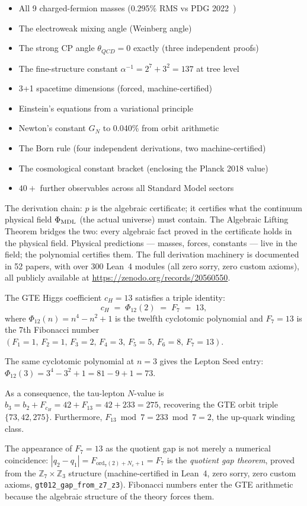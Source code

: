 \documentclass[11pt,a4paper]{article}
\begin{document}
\begin{itemize}
  \item All 9 charged-fermion masses (0.295\% RMS vs PDG 2022~\cite{SpivackSM})
  \item The electroweak mixing angle (Weinberg angle)
  \item The strong CP angle $\theta_{QCD} = 0$ exactly (three independent proofs)
  \item The fine-structure constant $\alpha^{-1} = 2^7 + 3^2 = 137$ at tree level
  \item 3+1 spacetime dimensions (forced, machine-certified)
  \item Einstein's equations from a variational principle
  \item Newton's constant $G_N$ to 0.040\% from orbit arithmetic
  \item The Born rule (four independent derivations, two machine-certified)
  \item The cosmological constant bracket (enclosing the Planck 2018 value)
  \item $40+$ further observables across all Standard Model sectors
\end{itemize}

The derivation chain: $p$ is the algebraic certificate; it certifies what the
continuum physical field $\Phi_{\rm MDL}$ (the actual universe) must contain.
The Algebraic Lifting Theorem bridges the two: every algebraic fact proved in the
certificate holds in the physical field.  Physical predictions --- masses, forces,
constants --- live in the field; the polynomial certifies them.
The full derivation machinery is documented in 52 papers, with over 300 Lean~4
modules (all zero sorry, zero custom axioms), all publicly available at
\url{https://zenodo.org/records/20560550}.

\bigskip
\begin{tcolorbox}[colback=boxorange,colframe=orange!60!black,
  title=Special numbers: cyclotomic identities]
The GTE Higgs coefficient $c_H = 13$ satisfies a triple identity:
\[
  c_H \;=\; \Phi_{12}(2) \;=\; F_7 \;=\; 13,
\]
where $\Phi_{12}(n) = n^4 - n^2 + 1$ is the twelfth cyclotomic polynomial
and $F_7 = 13$ is the 7th Fibonacci number
$(F_1=1,\,F_2=1,\,F_3=2,\,F_4=3,\,F_5=5,\,F_6=8,\,F_7=13)$.

The same cyclotomic polynomial at $n = 3$ gives the Lepton Seed entry:
$\Phi_{12}(3) = 3^4 - 3^2 + 1 = 81 - 9 + 1 = 73$.

As a consequence, the tau-lepton $N$-value is
$b_3 = b_2 + F_{c_H} = 42 + F_{13} = 42 + 233 = 275$,
recovering the GTE orbit triple $\{73, 42, 275\}$.
Furthermore, $F_{13} \bmod 7 = 233 \bmod 7 = 2$, the up-quark winding class.

The appearance of $F_7 = 13$ as the quotient gap is not merely a numerical
coincidence: $|q_2 - q_1| = F_{\mathrm{ord}_7(2) + N_c + 1} = F_7$ is the
\emph{quotient gap theorem}, proved from the $\mathbb{Z}_7 \times \mathbb{Z}_3$
structure (machine-certified in Lean~4, zero sorry, zero custom axioms,
\texttt{gt012\_gap\_from\_z7\_z3}).
Fibonacci numbers enter the GTE arithmetic because the algebraic structure of
the theory forces them.
\end{tcolorbox}
\end{document}
